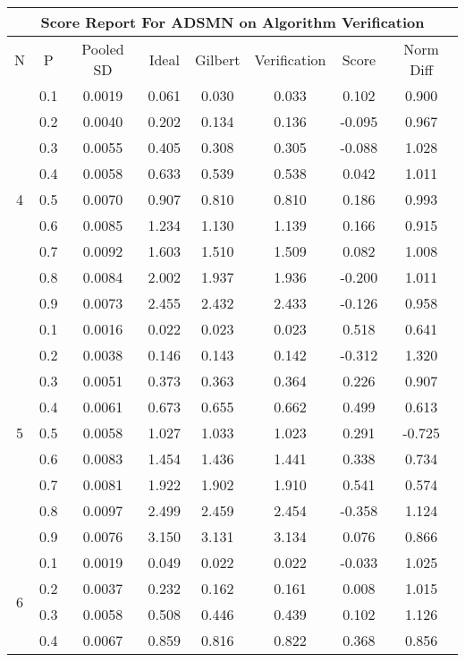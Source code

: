 \documentclass[11pt,a4paper]{report}
\begin{document}
\begin{longtable}{ | c | c || c | c | c | c | c | c | }
\hline
\multicolumn{8}{|c|}{ Score Report For ADSMN on Algorithm Verification} \\
\hline
N & P & Pooled SD &  Ideal &  Gilbert & Verification  & Score & Norm Diff \\
 \hline
 \hline
 \endhead
\multirow{9}{*}{4} & 0.1 & 0.0019 & 0.061 & 0.030 & 0.033 & 0.102 & 0.900 \\
 & 0.2 & 0.0040 & 0.202 & 0.134 & 0.136 & -0.095 & 0.967 \\
 & 0.3 & 0.0055 & 0.405 & 0.308 & 0.305 & -0.088 & 1.028 \\
 & 0.4 & 0.0058 & 0.633 & 0.539 & 0.538 & 0.042 & 1.011 \\
 & 0.5 & 0.0070 & 0.907 & 0.810 & 0.810 & 0.186 & 0.993 \\
 & 0.6 & 0.0085 & 1.234 & 1.130 & 1.139 & 0.166 & 0.915 \\
 & 0.7 & 0.0092 & 1.603 & 1.510 & 1.509 & 0.082 & 1.008 \\
 & 0.8 & 0.0084 & 2.002 & 1.937 & 1.936 & -0.200 & 1.011 \\
 & 0.9 & 0.0073 & 2.455 & 2.432 & 2.433 & -0.126 & 0.958 \\
 \hline
\multirow{9}{*}{5} & 0.1 & 0.0016 & 0.022 & 0.023 & 0.023 & 0.518 & 0.641 \\
 & 0.2 & 0.0038 & 0.146 & 0.143 & 0.142 & -0.312 & 1.320 \\
 & 0.3 & 0.0051 & 0.373 & 0.363 & 0.364 & 0.226 & 0.907 \\
 & 0.4 & 0.0061 & 0.673 & 0.655 & 0.662 & 0.499 & 0.613 \\
 & 0.5 & 0.0058 & 1.027 & 1.033 & 1.023 & 0.291 & -0.725 \\
 & 0.6 & 0.0083 & 1.454 & 1.436 & 1.441 & 0.338 & 0.734 \\
 & 0.7 & 0.0081 & 1.922 & 1.902 & 1.910 & 0.541 & 0.574 \\
 & 0.8 & 0.0097 & 2.499 & 2.459 & 2.454 & -0.358 & 1.124 \\
 & 0.9 & 0.0076 & 3.150 & 3.131 & 3.134 & 0.076 & 0.866 \\
 \hline
\multirow{9}{*}{6} & 0.1 & 0.0019 & 0.049 & 0.022 & 0.022 & -0.033 & 1.025 \\
 & 0.2 & 0.0037 & 0.232 & 0.162 & 0.161 & 0.008 & 1.015 \\
 & 0.3 & 0.0058 & 0.508 & 0.446 & 0.439 & 0.102 & 1.126 \\
 & 0.4 & 0.0067 & 0.859 & 0.816 & 0.822 & 0.368 & 0.856 \\

\end{longtable}
\end{document}
